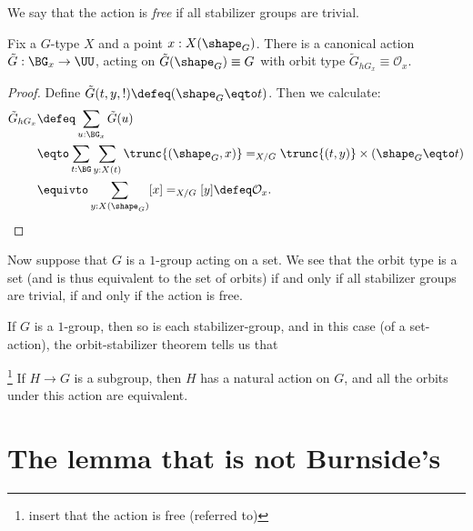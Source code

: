 We say that the action is \emph{free} if all stabilizer groups are trivial.

\begin{theorem}
  \label{thm:orbitstab}
  Fix a $G$-type $X$ and a point $x : X(\shape_G)$.
  There is a canonical action $\tilde G : \BG_x \to \UU$,
  acting on $\tilde G(\shape_G)\equiv G$
  with orbit type $\tilde G_{hG_x} \equiv \mathcal O_x$.
\end{theorem}
\begin{proof}
  Define $\tilde G(t,y,!) \defeq (\shape_G \eqto t)$.
  Then we calculate:
  \begin{align*}
    \tilde G_{hG_x}
    &\defeq \sum_{u : \BG_x}\tilde G(u) \\
    &\eqto \sum_{t:\BG}\sum_{y:X(t)}\trunc{(\shape_G,x)} =_{X/G} \trunc{(t,y)}
      \times (\shape_G \eqto t) \\
    &\equivto \sum_{y:X(\shape_G)}[x] =_{X/G} [y] \defeq \mathcal O_x.\qedhere
  \end{align*}
\end{proof}

Now suppose that $G$ is a $1$-group acting on a set.
We see that the orbit type is a set
(and is thus equivalent to the set of orbits)
if and only if
all stabilizer groups are trivial,
\ie if and only if the action is free.

If $G$ is a $1$-group,
then so is each stabilizer-group,
and in this case (of a set-action),
the orbit-stabilizer theorem
tells us that

\begin{theorem}\footnote{insert that the action is free (referred to)}
\label{thm:lagrange}
  If $H \to G$ is a subgroup, then $H$ has a natural action on $G$,
  and all the orbits under this action are equivalent.
\end{theorem}


\section{The lemma that is not Burnside's}
\label{sec:burnsides-lemma}
\label{lem:burnsides-lemma}

